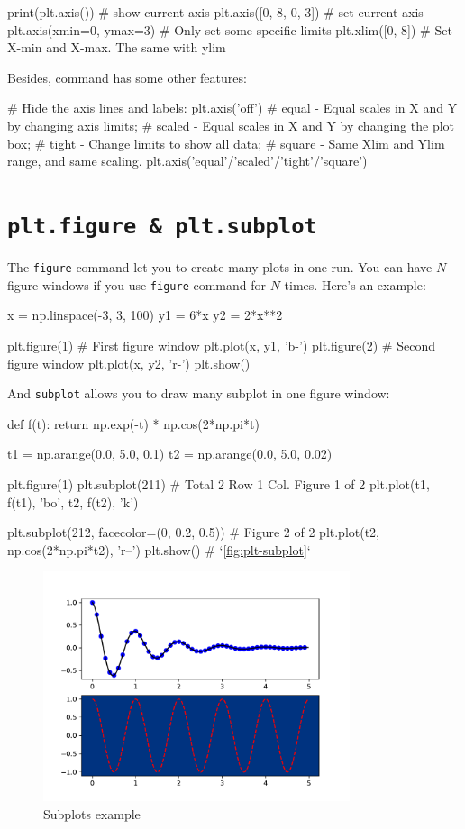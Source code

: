 \documentclass{report}
\begin{document}
\begin{py}
print(plt.axis()) # show current axis
plt.axis([0, 8, 0, 3]) # set current axis
plt.axis(xmin=0, ymax=3) # Only set some specific limits
plt.xlim([0, 8]) # Set X-min and X-max. The same with ylim
\end{py}

Besides,  command has some other features:
\begin{py}
# Hide the axis lines and labels:
plt.axis('off')
# equal - Equal scales in X and Y by changing axis limits;
# scaled - Equal scales in X and Y by changing the plot box;
# tight - Change limits to show all data; 
# square - Same Xlim and Ylim range, and same scaling.
plt.axis('equal'/'scaled'/'tight'/'square')
\end{py}

\section{\texttt{plt.figure \& plt.subplot}}
The \texttt{figure} command let you to create many plots in one run. You can have $N$ figure windows if you use \texttt{figure} command for $N$ times. Here's an example:

\begin{py}
x = np.linspace(-3, 3, 100)
y1 = 6*x
y2 = 2*x**2

plt.figure(1) # First figure window
plt.plot(x, y1, 'b-')
plt.figure(2) # Second figure window
plt.plot(x, y2, 'r-')
plt.show()
\end{py}

And \texttt{subplot} allows you to draw many subplot in one figure window\cite{mplwebsite}:
\begin{py}
def f(t):
    return np.exp(-t) * np.cos(2*np.pi*t)

t1 = np.arange(0.0, 5.0, 0.1)
t2 = np.arange(0.0, 5.0, 0.02)

plt.figure(1)
plt.subplot(211)  # Total 2 Row 1 Col. Figure 1 of 2
plt.plot(t1, f(t1), 'bo', t2, f(t2), 'k')

plt.subplot(212, facecolor=(0, 0.2, 0.5))  # Figure 2 of 2
plt.plot(t2, np.cos(2*np.pi*t2), 'r--')
plt.show() # `\autoref{fig:plt-subplot}`
\end{py}

\begin{figure}[!htb]
  \centering
  \includegraphics[width=90mm]{plt-subplot}
  \caption{Subplots example}
  \label{fig:plt-subplot}
\end{figure}
\end{document}
